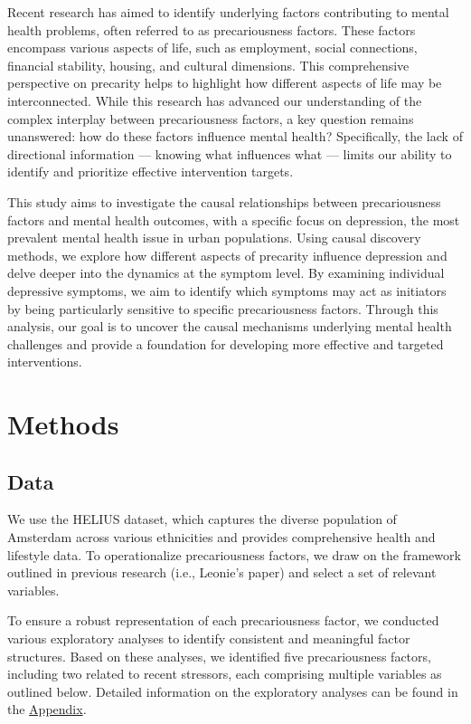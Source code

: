 \documentclass[
]{article}
\begin{document}
Recent research has aimed to identify underlying factors contributing to
mental health problems, often referred to as precariousness factors.
These factors encompass various aspects of life, such as employment,
social connections, financial stability, housing, and cultural
dimensions. This comprehensive perspective on precarity helps to
highlight how different aspects of life may be interconnected. While
this research has advanced our understanding of the complex interplay
between precariousness factors, a key question remains unanswered: how
do these factors influence mental health? Specifically, the lack of
directional information --- knowing what influences what --- limits our
ability to identify and prioritize effective intervention targets.

This study aims to investigate the causal relationships between
precariousness factors and mental health outcomes, with a specific focus
on depression, the most prevalent mental health issue in urban
populations. Using causal discovery methods, we explore how different
aspects of precarity influence depression and delve deeper into the
dynamics at the symptom level. By examining individual depressive
symptoms, we aim to identify which symptoms may act as initiators by
being particularly sensitive to specific precariousness factors. Through
this analysis, our goal is to uncover the causal mechanisms underlying
mental health challenges and provide a foundation for developing more
effective and targeted interventions.

\section{Methods}\label{methods}

\subsection{Data}\label{data}

We use the HELIUS dataset, which captures the diverse population of
Amsterdam across various ethnicities and provides comprehensive health
and lifestyle data. To operationalize precariousness factors, we draw on
the framework outlined in previous research (i.e., Leonie's paper) and
select a set of relevant variables.

To ensure a robust representation of each precariousness factor, we
conducted various exploratory analyses to identify consistent and
meaningful factor structures. Based on these analyses, we identified
five precariousness factors, including two related to recent stressors,
each comprising multiple variables as outlined below. Detailed
information on the exploratory analyses can be found in the
\hyperref[sec-appendix]{Appendix}.
\end{document}
